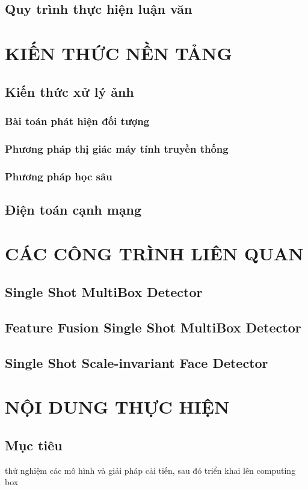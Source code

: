 \documentclass[a4paper]{report}
\begin{document}
\section{Quy trình thực hiện luận văn}

\chapter{KIẾN THỨC NỀN TẢNG}
\section{Kiến thức xử lý ảnh}
\subsection{Bài toán phát hiện đối tượng}
\subsection{Phương pháp thị giác máy tính truyền thống}
\subsection{Phương pháp học sâu}
\section{Điện toán cạnh mạng}

\chapter{CÁC CÔNG TRÌNH LIÊN QUAN }
\section{Single Shot MultiBox Detector}
\section{Feature Fusion Single Shot MultiBox Detector}
\section{Single Shot Scale-invariant Face Detector }

\chapter{NỘI DUNG THỰC HIỆN}
\section{Mục tiêu} thử nghiệm các mô hình và giải pháp cải tiến, sau đó triển khai lên computing box
\end{document}
